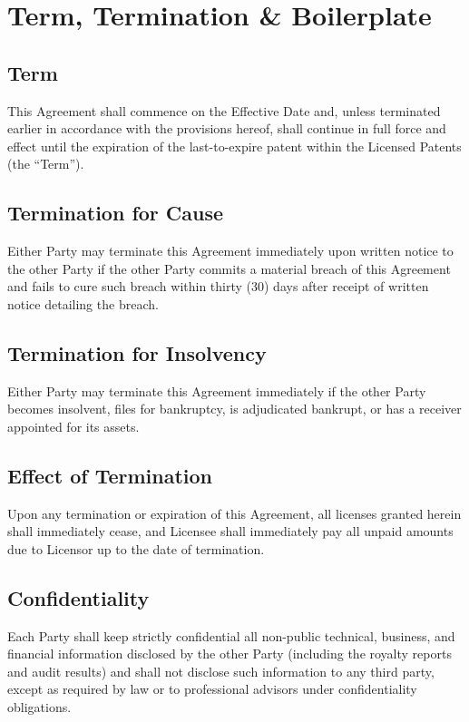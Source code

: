 \section{Term, Termination \& Boilerplate}

\subsection{Term} This Agreement shall commence on the Effective Date and, unless terminated earlier in accordance with the provisions hereof, shall continue in full force and effect until the expiration of the last-to-expire patent within the Licensed Patents (the ``Term'').

\subsection{Termination for Cause} Either Party may terminate this Agreement immediately upon written notice to the other Party if the other Party commits a material breach of this Agreement and fails to cure such breach within thirty (30) days after receipt of written notice detailing the breach.

\subsection{Termination for Insolvency} Either Party may terminate this Agreement immediately if the other Party becomes insolvent, files for bankruptcy, is adjudicated bankrupt, or has a receiver appointed for its assets.

\subsection{Effect of Termination} Upon any termination or expiration of this Agreement, all licenses granted herein shall immediately cease, and Licensee shall immediately pay all unpaid amounts due to Licensor up to the date of termination.

\subsection{Confidentiality} Each Party shall keep strictly confidential all non-public technical, business, and financial information disclosed by the other Party (including the royalty reports and audit results) and shall not disclose such information to any third party, except as required by law or to professional advisors under confidentiality obligations.

